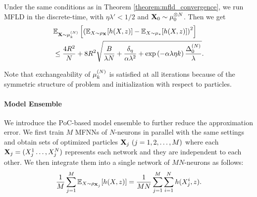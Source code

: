 \begin{theorem}\label{theorem:point_approximation_mfld}
    Under the same conditions as in Theorem \ref{theorem:mfld_convergence}, we run MFLD in the discrete-time, with $\eta \lambda' < 1/2$ and $\vX_0 \sim \tensor[\mu,N]_0$. Then we get
    \begin{align*}
        &\bE_{\vX \sim \pow[\mu,N]_k}\left[ \left( \bE_{X \sim \rho_\vX}[ h(X,z)] - \bE_{X\sim\mu_*}[h(X,z)]\right)^2 \right]  \notag\\
        &\leq \frac{4R^2}{N} + 8R^2 \sqrt{\frac{B}{\lambda N} + \frac{\delta_\eta}{\alpha \lambda^2} + \exp\left(-\alpha \lambda \eta k\right)\frac{\pow[\Delta,N]_0}{\lambda}}. 
    \end{align*}
\end{theorem}
Note that exchangeability of $\pow[\mu,N]_k$ is satisfied at all iterations because of the symmetric structure of problem and initialization with respect to particles. 

\paragraph{Model Ensemble}
We introduce the PoC-based model ensemble to further reduce the approximation error. We first train $M$ MFNNs of $N$-neurons in parallel with the same settings and obtain sets of optimized particles $\mathbf{X}_j~(j=1,2,\ldots,M)$ where each $\mathbf{X}_j = (X^1_j\ldots,X^N_j)$ represents each network and they are independent to each other. We then integrate them into a single network of $MN$-neurons as follows:
\begin{equation}\label{eq:merged_network}
    \frac{1}{M}\sum_{j=1}^M \mathbb{E}_{X\sim \rho_{\mathbf{X}_j}}[h(X,z)]
    = \frac{1}{MN}\sum_{j=1}^M \sum_{i=1}^N h(X^i_j,z).
\end{equation}

